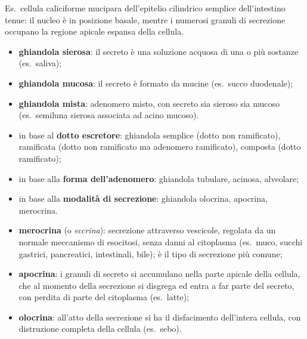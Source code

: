 Es.\ cellula caliciforme mucipara dell'epitelio cilindrico semplice dell'intestino tenue: il nucleo è in posizione basale, mentre i numerosi granuli di secrezione occupano la regione apicale espansa della cellula.

\begin{itemize}
  \item \textbf{ghiandola sierosa}: il secreto è una soluzione acquosa di una o più sostanze (es.\ saliva);
  \item \textbf{ghiandola mucosa}: il secreto è formato da mucine (es.\ succo duodenale);
  \item \textbf{ghiandola mista}: adenomero misto, con secreto sia sieroso sia mucoso (es.\ semiluna sierosa associata ad acino mucoso).
\end{itemize}

\begin{itemize}
  \item in base al \textbf{dotto escretore}: ghiandola semplice (dotto non ramificato), ramificata (dotto non ramificato ma adenomero ramificato), composta (dotto ramificato);
  \item in base alla \textbf{forma dell'adenomero}: ghiandola tubulare, acinosa, alveolare;
  \item in base alla \textbf{modalità di secrezione}: ghiandola olocrina, apocrina, merocrina.
\end{itemize}

\begin{itemize}
  \item \textbf{merocrina} (o \textit{eccrina}): secrezione attraverso vescicole, regolata da un normale meccanismo di esocitosi, senza danni al citoplasma (es.\ muco, succhi gastrici, pancreatici, intestinali, bile); è il tipo di secrezione più comune;
  \item \textbf{apocrina}: i granuli di secreto si accumulano nella parte apicale della cellula, che al momento della secrezione si disgrega ed entra a far parte del secreto, con perdita di parte del citoplasma (es.\ latte);
  \item \textbf{olocrina}: all'atto della secrezione si ha il disfacimento dell'intera cellula, con distruzione completa della cellula (es.\ sebo).
\end{itemize}

